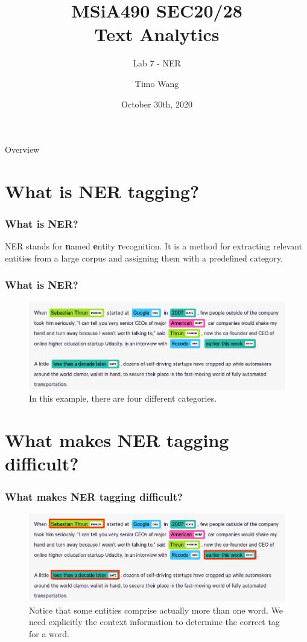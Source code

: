 \documentclass{beamer}
\begin{document}
\title{MSiA490 SEC20/28\\ Text Analytics}
\subtitle{Lab 7 - NER}
\author{Timo Wang}
\date{October 30th, 2020}

\begin{frame}
    \titlepage
\end{frame}

\begin{frame}{Overview}
    \tableofcontents[hideallsubsections]
\end{frame}

\section{What is NER tagging?}
\begin{frame}
    \frametitle{What is NER?}
    NER stands for \textbf{n}amed \textbf{e}ntity \textbf{r}ecognition. It is a method for extracting relevant entities from a large corpus and assigning them with a predefined category.
\end{frame}

\begin{frame}
    \frametitle{What is NER?}
    \begin{figure}
        \includegraphics[scale=0.3]{ner_example}
        \caption{In this example, there are four different categories.}
    \end{figure}
\end{frame}


\section{What makes NER tagging difficult?}
\begin{frame}
    \frametitle{What makes NER tagging difficult?}
    \begin{figure}
        \includegraphics[scale=0.3]{ner_example_difficult}
        \caption{Notice that some entities comprise actually more than one word. We need explicitly the context information to determine the correct tag for a word.}
    \end{figure}
\end{frame}
\end{document}
